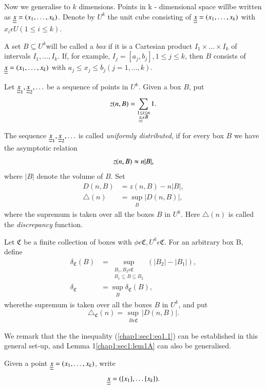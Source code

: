 Now we generalise to $k$ dimensions. Points in k - dimensional space
will\pageoriginale be written as $\underline{\underline{x}}= (x_{1}, \ldots, x_{k})$. Denote by $U^{k}$ the unit cube consisting of $\underline{\underline{x}}= (x_{1}, \ldots, x_{k})$ 
with $x_{i} \epsilon U (1 \leq i \leq k)$.

A set $B \subseteq U^{k}$will be called a {\em box} if it is a Cartesian product $I_{1} \times \ldots \times I_{k}$ of intervals $I_{1}, \ldots, I_{k}$. If, for example, $I_{j} = [a_{j}, b_{j}], 1\leq j \leq k$, then $B$ consists of $\underline{\underline{x}}= (x_{1}, \ldots, x_{k})$ 
with $a_{j} \leq x_{j} \leq b_{j} (j = 1, \ldots, k)$.

Let $\underline{\underline{x}}_{1}, \underline{\underline{x}}_{2}, \ldots$ be a sequence of points in $U^{k}$. Given a box $B$, put 
$$
z(n, B) = \sum_{\substack{1 \leq i \leq n\\\underline{\underline{x_{i}}} \epsilon B}}1.
$$

The sequence $\underline{\underline{x}}_{1}, \underline{\underline{x}}_{2}, \ldots$ is called {\em uniformly distributed}, if for every box $B$ we have the asymptotic relation
$$
z(n, B) \thickapprox n|B|,
$$
where $|B|$ denote the volume of $B$. Set
\begin{align*}
D(n, B) & = z(n, B) - n|B|,\\
\triangle(n) & = \sup_{\substack{B}} |D(n, B)|,
\end{align*}
where the supremum is taken over all the boxes $B$ in $U^{k}$. Here $\triangle(n)$ is called the {\em discrepancy} function.

Let $\mathfrak{C}$ be a finite collection of boxes with $\phi \epsilon \mathfrak{C}, U^{k} \epsilon \mathfrak{C}$. For an arbitrary box B, define
\begin{align*}
\delta_{\mathfrak{C}}(B) & = \sup_{\substack{B_{1}, B_{2} \epsilon \mathfrak{C}\\B_{1} \subseteq B \subseteq B_{2}}} (|B_{2}| - |B_{1}|),\\
 \delta_{\mathfrak{C}} & = \sup_{\substack{B}} \delta_{\mathfrak{C}}(B),
\end{align*}
where\pageoriginale the supremum is taken over all the boxes $B$ in $U^{k}$, and put
$$
\triangle_{\mathfrak{C}}(n) = \sup_{\substack{B \epsilon \mathfrak{C}}} |D(n, B)|.
$$

We remark that the the inequality (\ref{chap1:sec1:eq1.1}) can be established in this general set-up, and Lemma 1\ref{chap1:sec1:lem1A} can also be generalised.

Given a point $\underline{\underline{x}} = (x_{1}, \ldots, x_{k})$, write
$$
\underline{\underline{x}} = (\{x_{1}\}, \ldots \{x_{k}\}).
$$

